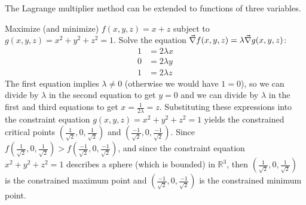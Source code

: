 The Lagrange multiplier method can be extended to functions of three variables.

\begin{example}\label{ex_lagr_3var}%
Maximize (and minimize) $f(x,y,z) = x+z$ subject to $g(x,y,z) = x^2 + y^2 + z^2 = 1$.
\solution
Solve the equation $\vec\nabla f(x,y,z) = \lambda \vec\nabla g(x,y,z)$:
 \begin{align*}
  1 &= 2\lambda x\\
  0 &= 2\lambda y\\
  1 &= 2\lambda z
 \end{align*}
 The first equation implies $\lambda \ne 0$ (otherwise we would have $1=0$), so we can divide by $\lambda$ in the second equation to get $y=0$ and we can divide by $\lambda$ in the first and third equations to get $x=\frac1{2\lambda}=z$. Substituting these expressions into the constraint equation $g(x,y,z) = x^2 + y^2 + z^2 = 1$ yields the constrained critical points $\left( \frac1{\sqrt2},0,\frac1{\sqrt2} \right)$ and $\left( \frac{-1}{\sqrt2},0,\frac{-1}{\sqrt2}\right)$. Since $f\left( \frac1{\sqrt2},0,\frac1{\sqrt2}\right)>f\left(\frac{-1}{\sqrt2},0,\frac{-1}{\sqrt2}\right)$, and since the constraint equation $x^2 + y^2 + z^2 = 1$ describes a sphere (which is bounded) in $\mathbb{R}^3$, then $\left(\frac1{\sqrt2},0,\frac1{\sqrt2}\right)$ is the constrained maximum point and $\left(\frac{-1}{\sqrt2},0,\frac{-1}{\sqrt2}\right)$ is the constrained minimum point.
\end{example}

%

